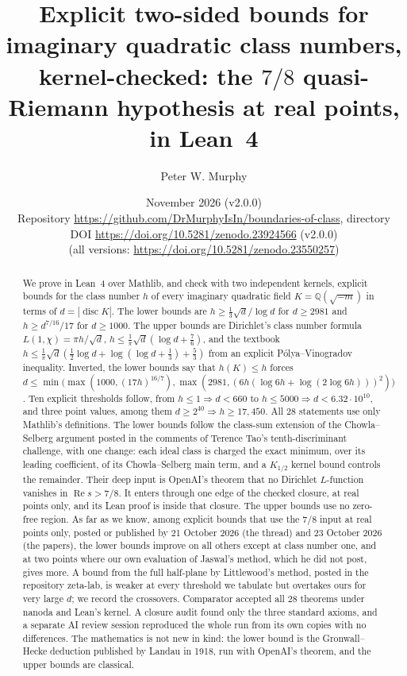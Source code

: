 \documentclass[11pt]{article}
\title{Explicit two-sided bounds for imaginary quadratic class numbers, kernel-checked: the $7/8$ quasi-Riemann hypothesis at real points, in Lean~4}
\author{Peter W. Murphy}
\date{November 2026 (v2.0.0)\\[2pt] \small Repository \url{https://github.com/DrMurphyIsIn/boundaries-of-class}, directory \lean{two-sided-bounds/}\\ \small DOI \url{https://doi.org/10.5281/zenodo.23924566} (v2.0.0)\\ \small (all versions: \url{https://doi.org/10.5281/zenodo.23550257})}
\theoremstyle{definition}
\newcommand{\re}{\operatorname{Re}}
\newcommand{\Q}{\mathbb{Q}}
\newcommand{\disc}{\operatorname{disc}}
\begin{document}
\maketitle

\begin{abstract}
We prove in Lean~4 over Mathlib, and check with two independent kernels, explicit bounds for the class number $h$ of every imaginary quadratic field $K = \Q(\sqrt{-m})$ in terms of $d = |\disc K|$. The lower bounds are $h \ge \frac13\sqrt d/\log d$ for $d \ge 2981$ and $h \ge d^{7/16}/17$ for $d \ge 1000$. The upper bounds are Dirichlet's class number formula $L(1,\chi) = \pi h/\sqrt d$, $h \le \frac1\pi\sqrt d(\log d + \frac76)$, and the textbook $h \le \frac1\pi\sqrt d(\frac12\log d + \log(\log d + \frac13) + \frac53)$ from an explicit P\'olya--Vinogradov inequality. Inverted, the lower bounds say that $h(K) \le h$ forces $d \le \min\bigl(\max(1000, (17h)^{16/7}), \max(2981, (6h(\log 6h + \log(2\log 6h)))^2)\bigr)$. Ten explicit thresholds follow, from $h \le 1 \Rightarrow d < 660$ to $h \le 5000 \Rightarrow d < 6.32\cdot 10^{10}$, and three point values, among them $d \ge 2^{40} \Rightarrow h \ge 17{,}450$. All $28$ statements use only Mathlib's definitions. The lower bounds follow the class-sum extension of the Chowla--Selberg argument posted in the comments of Terence Tao's tenth-discriminant challenge, with one change: each ideal class is charged the exact minimum, over its leading coefficient, of its Chowla--Selberg main term, and a $K_{1/2}$ kernel bound controls the remainder. Their deep input is OpenAI's theorem that no Dirichlet $L$-function vanishes in $\re s > 7/8$. It enters through one edge of the checked closure, at real points only, and its Lean proof is inside that closure. The upper bounds use no zero-free region. As far as we know, among explicit bounds that use the $7/8$ input at real points only, posted or published by 21 October 2026 (the thread) and 23 October 2026 (the papers), the lower bounds improve on all others except at class number one, and at two points where our own evaluation of Jaswal's method, which he did not post, gives more. A bound from the full half-plane by Littlewood's method, posted in the repository zeta-lab, is weaker at every threshold we tabulate but overtakes ours for very large $d$; we record the crossovers. Comparator accepted all $28$ theorems under nanoda and Lean's kernel. A closure audit found only the three standard axioms, and a separate AI review session reproduced the whole run from its own copies with no differences. The mathematics is not new in kind: the lower bound is the Gronwall--Hecke deduction published by Landau in 1918, run with OpenAI's theorem, and the upper bounds are classical.
\end{abstract}
\end{document}
